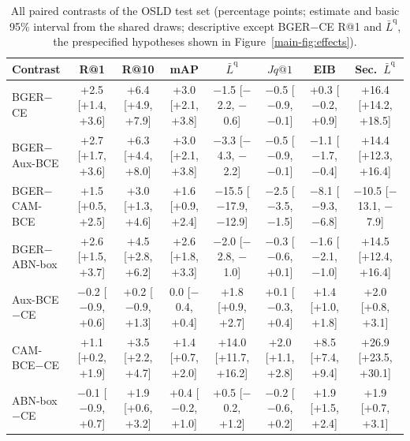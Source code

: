 \begin{table}[t]
\centering\footnotesize\setlength{\tabcolsep}{3pt}
\caption{All paired contrasts of the OSLD test set (percentage points; estimate and basic 95\% interval from the shared draws; descriptive except BGER$-$CE R@1 and $\bar L^{\mathrm q}$, the prespecified hypotheses shown in Figure~\ref*{main-fig:effects}).}
\label{tab:osld-contrasts-all}
\begin{tabular}{lccccccc}
\toprule
Contrast & R@1 & R@10 & mAP & $\bar L^{\mathrm q}$ & $Jq@1$ & EIB & Sec.\ $\bar L^{\mathrm q}$\\
\midrule
BGER$-$CE & +2.5 [+1.4, +3.6] & +6.4 [+4.9, +7.9] & +3.0 [+2.1, +3.8] & $-$1.5 [$-$2.2, $-$0.6] & $-$0.5 [$-$0.9, $-$0.1] & +0.3 [$-$0.2, +0.9] & +16.4 [+14.2, +18.5]\\
BGER$-$Aux-BCE & +2.7 [+1.7, +3.6] & +6.3 [+4.4, +8.0] & +3.0 [+2.1, +3.8] & $-$3.3 [$-$4.3, $-$2.2] & $-$0.5 [$-$0.9, $-$0.1] & $-$1.1 [$-$1.7, $-$0.4] & +14.4 [+12.3, +16.4]\\
BGER$-$CAM-BCE & +1.5 [+0.5, +2.5] & +3.0 [+1.3, +4.6] & +1.6 [+0.9, +2.4] & $-$15.5 [$-$17.9, $-$12.9] & $-$2.5 [$-$3.5, $-$1.5] & $-$8.1 [$-$9.3, $-$6.8] & $-$10.5 [$-$13.1, $-$7.9]\\
BGER$-$ABN-box & +2.6 [+1.5, +3.7] & +4.5 [+2.8, +6.2] & +2.6 [+1.8, +3.3] & $-$2.0 [$-$2.8, $-$1.0] & $-$0.3 [$-$0.6, +0.1] & $-$1.6 [$-$2.1, $-$1.0] & +14.5 [+12.4, +16.4]\\
Aux-BCE$-$CE & $-$0.2 [$-$0.9, +0.6] & +0.2 [$-$0.9, +1.3] & 0.0 [$-$0.4, +0.4] & +1.8 [+0.9, +2.7] & +0.1 [$-$0.3, +0.4] & +1.4 [+1.0, +1.8] & +2.0 [+0.8, +3.1]\\
CAM-BCE$-$CE & +1.1 [+0.2, +1.9] & +3.5 [+2.2, +4.7] & +1.4 [+0.7, +2.0] & +14.0 [+11.7, +16.2] & +2.0 [+1.1, +2.8] & +8.5 [+7.4, +9.4] & +26.9 [+23.5, +30.1]\\
ABN-box$-$CE & $-$0.1 [$-$0.9, +0.7] & +1.9 [+0.6, +3.2] & +0.4 [$-$0.2, +1.0] & +0.5 [$-$0.2, +1.2] & $-$0.2 [$-$0.6, +0.2] & +1.9 [+1.5, +2.4] & +1.9 [+0.7, +3.1]\\
\bottomrule
\end{tabular}
\end{table}
